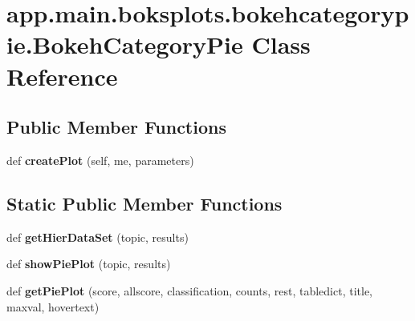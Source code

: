 \hypertarget{classapp_1_1main_1_1boksplots_1_1bokehcategorypie_1_1BokehCategoryPie}{}\section{app.\+main.\+boksplots.\+bokehcategorypie.\+Bokeh\+Category\+Pie Class Reference}
\label{classapp_1_1main_1_1boksplots_1_1bokehcategorypie_1_1BokehCategoryPie}
\subsection*{Public Member Functions}
\begin{DoxyCompactItemize}
\item 
\mbox{\label{classapp_1_1main_1_1boksplots_1_1bokehcategorypie_1_1BokehCategoryPie_a7086699c3229fd34a3c55ae80896088a}} 
def {\bfseries create\+Plot} (self, me, parameters)
\end{DoxyCompactItemize}
\subsection*{Static Public Member Functions}
\begin{DoxyCompactItemize}
\item 
\mbox{\label{classapp_1_1main_1_1boksplots_1_1bokehcategorypie_1_1BokehCategoryPie_a3562537adda021dc755550b2638c3c44}} 
def {\bfseries get\+Hier\+Data\+Set} (topic, results)
\item 
\mbox{\label{classapp_1_1main_1_1boksplots_1_1bokehcategorypie_1_1BokehCategoryPie_a57a3dbe0fd61566f0c64c3201e7cde7e}} 
def {\bfseries show\+Pie\+Plot} (topic, results)
\item 
\mbox{\label{classapp_1_1main_1_1boksplots_1_1bokehcategorypie_1_1BokehCategoryPie_afc514f480d70bdcc6fa2059ee7550199}} 
def {\bfseries get\+Pie\+Plot} (score, allscore, classification, counts, rest, tabledict, title, maxval, hovertext)
\end{DoxyCompactItemize}
